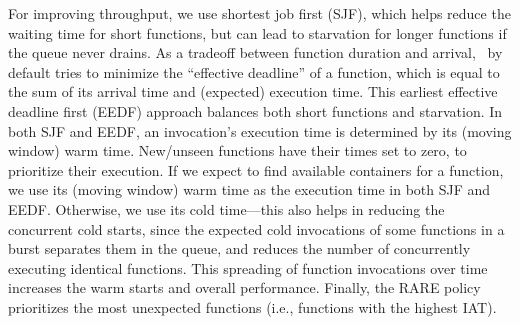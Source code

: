 For improving throughput, we use shortest job first (SJF), which helps reduce the waiting time for short functions, but can lead to starvation for longer functions if the queue never drains. 
As a tradeoff between function duration and arrival, \sysname~by default tries to minimize the ``effective deadline'' of a function, which is equal to the sum of its arrival time and (expected) execution time.
This earliest effective deadline first (EEDF) approach balances both short functions and starvation.
In both SJF and EEDF, an invocation's execution time is determined by its (moving window) warm time.
New/unseen functions have their times set to zero, to prioritize their execution.  
If we expect to find available containers for a function, we use its (moving window) warm time as the execution time in both SJF and EEDF.
Otherwise, we use its cold time---this also helps in reducing the concurrent cold starts, since the expected cold invocations of some functions in a burst separates them in the queue, and reduces the number of concurrently executing identical functions.
This spreading of function invocations over time increases the warm starts and overall performance. 
%
Finally, the RARE policy prioritizes the most unexpected functions (i.e., functions with the highest IAT). 





